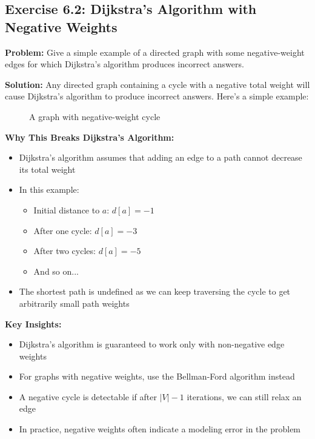 \subsection{Exercise 6.2: Dijkstra's Algorithm with Negative Weights}
\textbf{Problem:} Give a simple example of a directed graph with some negative-weight edges for which Dijkstra's algorithm produces incorrect answers.

\textbf{Solution:} Any directed graph containing a cycle with a negative total weight will cause Dijkstra's algorithm to produce incorrect answers. Here's a simple example:

\begin{figure}[H]
\centering
{}
\caption*{A graph with negative-weight cycle}
\end{figure}

\textbf{Why This Breaks Dijkstra's Algorithm:}
\begin{itemize}[noitemsep]
    \item Dijkstra's algorithm assumes that adding an edge to a path cannot decrease its total weight
    \item In this example:
        \begin{itemize}[noitemsep]
            \item Initial distance to $a$: $d[a] = -1$
            \item After one cycle: $d[a] = -3$
            \item After two cycles: $d[a] = -5$
            \item And so on...
        \end{itemize}
    \item The shortest path is undefined as we can keep traversing the cycle to get arbitrarily small path weights
\end{itemize}

\textbf{Key Insights:}
\begin{itemize}[noitemsep]
    \item Dijkstra's algorithm is guaranteed to work only with non-negative edge weights
    \item For graphs with negative weights, use the Bellman-Ford algorithm instead
    \item A negative cycle is detectable if after $|V|-1$ iterations, we can still relax an edge
    \item In practice, negative weights often indicate a modeling error in the problem
\end{itemize}

